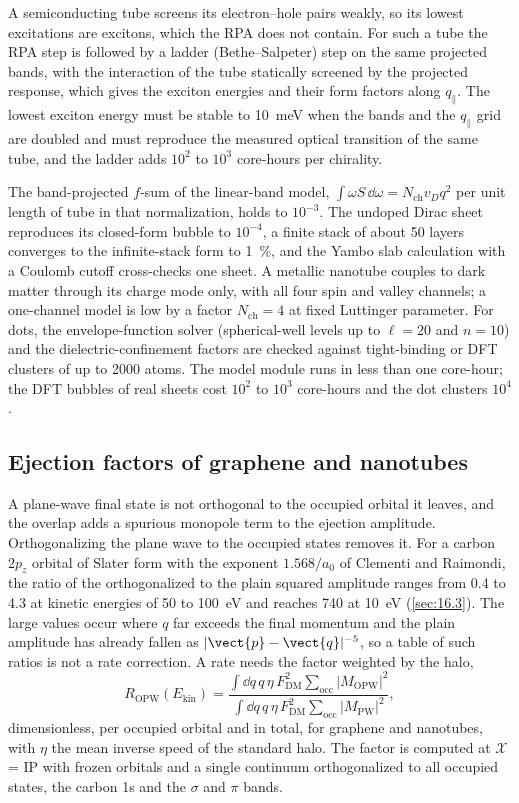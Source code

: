 A semiconducting tube screens its electron--hole pairs weakly, so its lowest excitations are excitons, which the RPA does not contain. For such a tube the RPA step is followed by a ladder (Bethe--Salpeter) step on the same projected bands, with the interaction of the tube statically screened by the projected response, which gives the exciton energies and their form factors along $q_\parallel$. The lowest exciton energy must be stable to \SI{10}{meV} when the bands and the $q_\parallel$ grid are doubled and must reproduce the measured optical transition of the same tube, and the ladder adds $10^2$ to $10^3$ core-hours per chirality.

The band-projected $f$-sum of the linear-band model, $\int\omega S\,\dd\omega = N_{\mathrm{ch}}v_Dq^2$ per unit length of tube in that normalization, holds to $10^{-3}$. The undoped Dirac sheet reproduces its closed-form bubble to $10^{-4}$, a finite stack of about 50 layers converges to the infinite-stack form to \SI{1}{\percent}, and the Yambo slab calculation with a Coulomb cutoff cross-checks one sheet. A metallic nanotube couples to dark matter through its charge mode only, with all four spin and valley channels; a one-channel model is low by a factor $N_{\mathrm{ch}} = 4$ at fixed Luttinger parameter. For dots, the envelope-function solver (spherical-well levels up to $\ell = 20$ and $n = 10$) and the dielectric-confinement factors are checked against tight-binding or DFT clusters of up to 2000 atoms. The model module runs in less than one core-hour; the DFT bubbles of real sheets cost $10^2$ to $10^3$ core-hours and the dot clusters $10^4$.

\subsection{Ejection factors of graphene and nanotubes}

A plane-wave final state is not orthogonal to the occupied orbital it leaves, and the overlap adds a spurious monopole term to the ejection amplitude. Orthogonalizing the plane wave to the occupied states removes it. For a carbon $2p_z$ orbital of Slater form with the exponent $1.568/a_0$ of Clementi and Raimondi, the ratio of the orthogonalized to the plain squared amplitude ranges from 0.4 to 4.3 at kinetic energies of 50 to \SI{100}{eV} and reaches 740 at \SI{10}{eV} (\cref{sec:16.3}). The large values occur where $q$ far exceeds the final momentum and the plain amplitude has already fallen as $|\vect{p} - \vect{q}|^{-5}$, so a table of such ratios is not a rate correction. A rate needs the factor weighted by the halo,
\begin{equation}
  R_{\mathrm{OPW}}(E_{\mathrm{kin}}) = \frac{\int\dd q\,q\,\eta\,F_{\mathrm{DM}}^2\sum_{\mathrm{occ}}|M_{\mathrm{OPW}}|^2}{\int\dd q\,q\,\eta\,F_{\mathrm{DM}}^2\sum_{\mathrm{occ}}|M_{\mathrm{PW}}|^2} ,
  \label{eq:E.21-ROPW}
\end{equation}
dimensionless, per occupied orbital and in total, for graphene and nanotubes, with $\eta$ the mean inverse speed of the standard halo. The factor is computed at $\mathcal{X}$ = IP with frozen orbitals and a single continuum orthogonalized to all occupied states, the carbon 1s and the $\sigma$ and $\pi$ bands.

